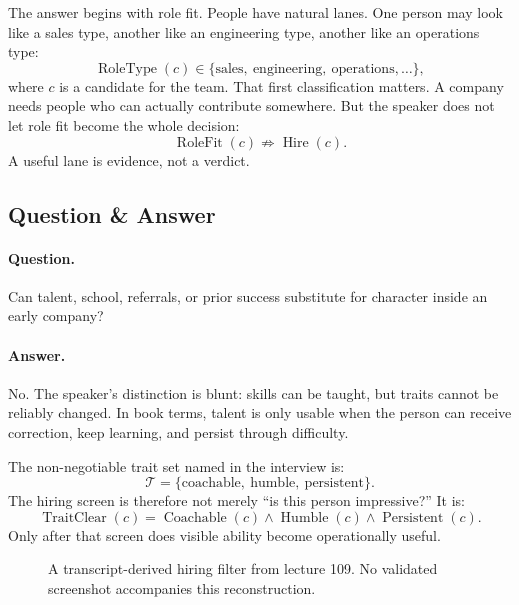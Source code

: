 \documentclass[11pt,oneside]{book}
\begin{document}
The answer begins with role fit. People have natural lanes. One person may look like a sales type, another like an engineering type, another like an operations type:
\[
\operatorname{RoleType}(c)
\in
\{\text{sales},\ \text{engineering},\ \text{operations},\ldots\},
\]
where \(c\) is a candidate for the team. That first classification matters. A company needs people who can actually contribute somewhere. But the speaker does not let role fit become the whole decision:
\[
\operatorname{RoleFit}(c)
\nRightarrow
\operatorname{Hire}(c).
\]
A useful lane is evidence, not a verdict.

\subsection{Question \& Answer}

\paragraph{Question.}
Can talent, school, referrals, or prior success substitute for character inside an early company?

\paragraph{Answer.}
No. The speaker's distinction is blunt: skills can be taught, but traits cannot be reliably changed. In book terms, talent is only usable when the person can receive correction, keep learning, and persist through difficulty.

The non-negotiable trait set named in the interview is:
\[
\mathcal{T}
=
\{\text{coachable},\ \text{humble},\ \text{persistent}\}.
\]
The hiring screen is therefore not merely ``is this person impressive?'' It is:
\[
\operatorname{TraitClear}(c)
=
\operatorname{Coachable}(c)
\land
\operatorname{Humble}(c)
\land
\operatorname{Persistent}(c).
\]
Only after that screen does visible ability become operationally useful.

\begin{figure}
\centering
{}
\caption{A transcript-derived hiring filter from lecture 109. No validated screenshot accompanies this reconstruction.}
\end{figure}
\end{document}
